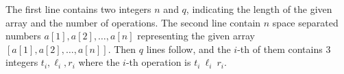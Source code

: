 The first line contains two integers $n$ and $q$, indicating 
the length of the given array and the number of operations.
The second line contain $n$ space separated numbers 
$a[1],a[2],\dots,a[n]$
representing 
the given array $[a[1],a[2],\dots,a[n]]$.
Then $q$ lines follow, and the $i$-th of them contains $3$ integers 
$t_{i}, \ell_{i}, r_{i}$ where the $i$-th operation
is $t_i~\ell_i~r_i$.
